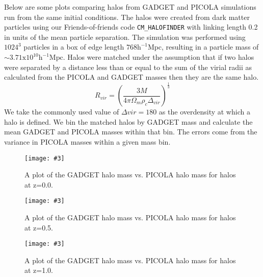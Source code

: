 \documentclass[12pt,twoside,a4paper]{article}
\providecommand{\incfig}[6]
{
\begin{figure}[h!]
   \centering
   \vspace{#1}
   \texttt{[image: \#3]}
   \caption[#4]{#5}
   \label{#6}    
\end{figure}
}
\begin{document}
Below are some plots comparing halos from GADGET and PICOLA simulations run from the same initial conditions. The halos were created from dark matter particles using our Friends-of-friends code \texttt{CM\_HALOFINDER} with linking length 0.2 in units of the mean particle separation. The simulation was performed using $1024^3$ particles in a box of edge length $768 \text{h}^{-1}\text{Mpc}$, resulting in a particle mass of $\sim3.71\text{x}10^{10} \text{h}^{-1}\text{Mpc}$. Halos were matched under the assumption that if two halos were separated by a distance less than or equal to the sum of the virial radii as calculated from the PICOLA and GADGET masses then they are the same halo.
\begin{equation}
R_{vir} = \left( \frac{3M}{4\pi\Omega_{m}\rho_{c}\Delta_{vir}} \right)^{\frac{1}{3}}
\end{equation} 
We take the commonly used value of $\Delta{vir}=180$ as the overdensity at which a halo is defined. We bin the matched halos by GADGET mass and calculate the mean GADGET and PICOLA masses within that bin. The errors come from the variance in PICOLA masses within a given mass bin.

\incfig{0pt}{\textwidth}{CM_GADGET_PICOLA_MATCH_L768_N1024_R101_z0p00.png}{}{A plot of the GADGET halo mass vs. PICOLA halo mass for halos at z=0.0.}{FOFChart}

\incfig{0pt}{\textwidth}{CM_GADGET_PICOLA_MATCH_L768_N1024_R101_z0p50.png}{}{A plot of the GADGET halo mass vs. PICOLA halo mass for halos at z=0.5.}{FOFChart}

\incfig{0pt}{\textwidth}{CM_GADGET_PICOLA_MATCH_L768_N1024_R101_z1p00.png}{}{A plot of the GADGET halo mass vs. PICOLA halo mass for halos at z=1.0.}{FOFChart}
\end{document}
